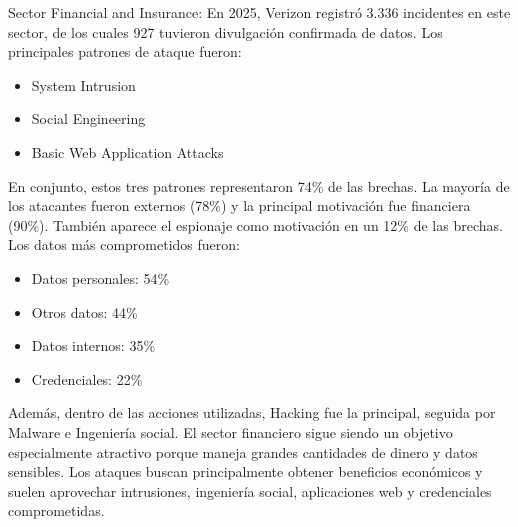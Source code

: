 \begin{respuesta}
  Sector Financial and Insurance:
  En 2025, Verizon registró 3.336 incidentes en este sector, de los cuales 927 tuvieron divulgación confirmada de datos. Los principales patrones de ataque fueron:
  \begin{itemize}
    \item System Intrusion
    \item Social Engineering
    \item Basic Web Application Attacks
  \end{itemize}
  En conjunto, estos tres patrones representaron 74\% de las brechas. La mayoría de los atacantes fueron externos (78\%) y la principal motivación fue financiera (90\%). También aparece el espionaje como motivación en un 12\% de las brechas. Los datos más comprometidos fueron:
  \begin{itemize}
    \item Datos personales: 54\%
    \item Otros datos: 44\%
    \item Datos internos: 35\%
    \item Credenciales: 22\%
  \end{itemize}
  Además, dentro de las acciones utilizadas, Hacking fue la principal, seguida por Malware e Ingeniería social. El sector financiero sigue siendo un objetivo especialmente atractivo porque maneja grandes cantidades de dinero y datos sensibles. Los ataques buscan principalmente obtener beneficios económicos y suelen aprovechar intrusiones, ingeniería social, aplicaciones web y credenciales comprometidas.

\end{respuesta}

